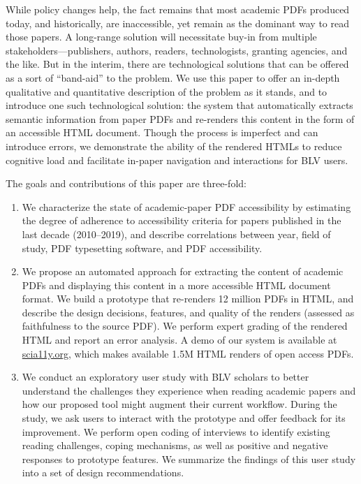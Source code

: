 While policy changes help, the fact remains that most academic PDFs produced today, and historically, are inaccessible, yet remain as the dominant way to read those papers. A long-range solution will necessitate buy-in from multiple stakeholders---publishers, authors, readers, technologists, granting agencies, and the like. But in the interim, there are technological solutions that can be offered as a sort of ``band-aid'' to the problem. We use this paper to offer an in-depth qualitative and quantitative description of the problem as it stands, and to introduce one such technological solution: the \scially system that automatically extracts semantic information from paper PDFs and re-renders this content in the form of an accessible HTML document. Though the process is imperfect and can introduce errors, we demonstrate the ability of the rendered HTMLs to reduce cognitive load and facilitate in-paper navigation and interactions for BLV users. 

The goals and contributions of this paper are three-fold:

\begin{enumerate}
    \item We characterize the state of academic-paper PDF accessibility by estimating the degree of adherence to accessibility criteria for papers published in the last decade (2010--2019), and describe correlations between year, field of study, PDF typesetting software, and PDF accessibility.
    \item We propose an automated approach for extracting the content of academic PDFs and displaying this content in a more accessible HTML document format. We build a prototype that re-renders 12 million PDFs in HTML, and describe the design decisions, features, and quality of the renders (assessed as faithfulness to the source PDF). We perform expert grading of the rendered HTML and report an error analysis. A demo of our system is available at \href{https://scia11y.org/}{scia11y.org}, which makes available 1.5M HTML renders of open access PDFs.
    \item We conduct an exploratory user study with \numusers BLV scholars to better understand the challenges they experience when reading academic papers and how our proposed tool might augment their current workflow. During the study, we ask users to interact with the prototype and offer feedback for its improvement. We perform open coding of interviews to identify existing reading challenges, coping mechanisms, as well as positive and negative responses to prototype features. We summarize the findings of this user study into a set of design recommendations.
\end{enumerate}


